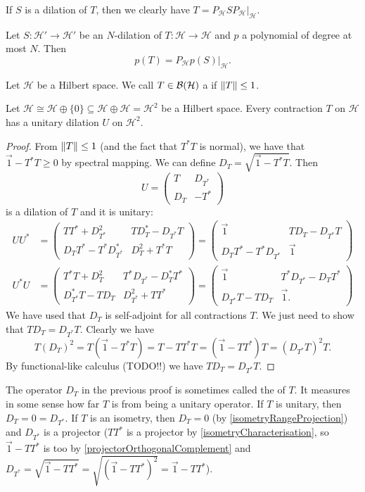 If $S$ is a dilation of $T$, then we clearly have $T = P_\mathcal{H} S P_\mathcal{H}|_\mathcal{H}$.

\begin{lemma}
Let $S:\mathcal{H}'\to\mathcal{H}'$ be an $N$-dilation of $T: \mathcal{H}\to \mathcal{H}$ and $p$ a polynomial of degree at most $N$. Then
\[ p(T) = P_\mathcal{H}p(S)|_\mathcal{H}. \]
\end{lemma}

Let $\mathcal{H}$ be a Hilbert space. We call $T\in\operatorname{\mathcal{B}}(\mathcal{H})$ a  if $\lVert T\rVert\leq 1$.
\begin{proposition} \label{dilationOfContraction}
Let $\mathcal{H} \cong \mathcal{H}\oplus \{0\} \subseteq \mathcal{H}\oplus \mathcal{H} = \mathcal{H}^2$ be a Hilbert space. Every contraction $T$ on $\mathcal{H}$ has a unitary dilation $U$ on $\mathcal{H}^2$.
\end{proposition}
\begin{proof}
From $\lVert T\rVert\leq 1$ (and the fact that $T^*T$ is normal), we have that $\vec{1}-T^*T\geq 0$ by spectral mapping. We can define $D_T = \sqrt{\vec{1}-T^*T}$. Then
\[ U = \begin{pmatrix}
T & D_{T^*} \\ D_T & -T^*
\end{pmatrix} \]
is a dilation of $T$ and it is unitary:
\begin{align*}
UU^* &= \begin{pmatrix}
TT^* + D_{T^*}^2 & TD_T^* - D_{T^*}T \\
D_TT^* - T^*D_{T^*}^* & D^2_{T} + T^*T
\end{pmatrix} = \begin{pmatrix}
\vec{1} & TD_T - D_{T^*}T \\
D_TT^* - T^*D_{T^*} & \vec{1}
\end{pmatrix} \\
U^*U &= \begin{pmatrix}
T^*T + D_{T}^2 & T^*D_{T^*} - D_{T}^*T^* \\
D_{T^*}^*T - TD_{T} & D^2_{T^*} + TT^*
\end{pmatrix} = \begin{pmatrix}
\vec{1} & T^*D_{T^*} - D_{T}T^* \\
D_{T^*}T - TD_{T} & \vec{1}.
\end{pmatrix}
\end{align*}
We have used that $D_T$ is self-adjoint for all contractions $T$. We just need to show that $TD_T = D_{T^*}T$. Clearly we have
\[ T(D_T)^2 = T(\vec{1} - T^*T) = T - TT^*T = (\vec{1} - TT^*)T = (D_{T^*}T)^2T. \]
By functional-like calculus (TODO!!) we have $TD_T = D_{T^*}T$.
\end{proof}
The operator $D_T$ in the previous proof is sometimes called the  of $T$. It measures in some sense how far $T$ is from being a unitary operator. If $T$ is unitary, then $D_T = 0 = D_{T^*}$. If $T$ is an isometry, then $D_T = 0$ (by \ref{isometryRangeProjection}) and $D_{T^*}$ is a projector ($TT^*$ is a projector by \ref{isometryCharacterisation}, so $\vec{1} - TT^*$ is too by \ref{projectorOrthogonalComplement} and $D_{T^*} = \sqrt{\vec{1}-TT^*} = \sqrt{(\vec{1}-TT^*)^2} = \vec{1}-TT^*$).

